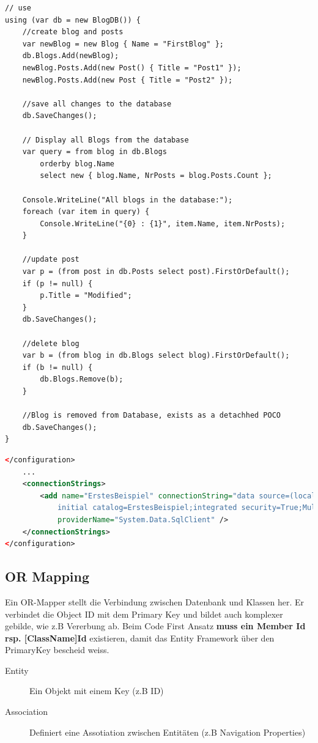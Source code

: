 \begin{lstlisting}
// use
using (var db = new BlogDB()) {
	//create blog and posts
	var newBlog = new Blog { Name = "FirstBlog" };
	db.Blogs.Add(newBlog);
	newBlog.Posts.Add(new Post() { Title = "Post1" });
	newBlog.Posts.Add(new Post { Title = "Post2" });
	
	//save all changes to the database
	db.SaveChanges();
	
	// Display all Blogs from the database 
	var query = from blog in db.Blogs
		orderby blog.Name
		select new { blog.Name, NrPosts = blog.Posts.Count };
	
	Console.WriteLine("All blogs in the database:");
	foreach (var item in query) {
		Console.WriteLine("{0} : {1}", item.Name, item.NrPosts);
	}
	
	//update post
	var p = (from post in db.Posts select post).FirstOrDefault();
	if (p != null) {
		p.Title = "Modified";
	}
	db.SaveChanges();

	//delete blog
	var b = (from blog in db.Blogs select blog).FirstOrDefault();
	if (b != null) {
		db.Blogs.Remove(b);
	}

	//Blog is removed from Database, exists as a detachhed POCO
	db.SaveChanges();
}
\end{lstlisting}

\begin{lstlisting}[language=XML, caption=app.config]
</configuration>
	...
	<connectionStrings>
		<add name="ErstesBeispiel" connectionString="data source=(localdb)\mssqllocaldb;
			initial catalog=ErstesBeispiel;integrated security=True;MultipleActiveResultSets=True;App=EntityFramework"
			providerName="System.Data.SqlClient" />
	</connectionStrings>
</configuration>
\end{lstlisting}

\subsection{OR Mapping}
Ein OR-Mapper stellt die Verbindung zwischen Datenbank und Klassen her. Er verbindet die Object ID mit dem Primary Key und bildet auch komplexer gebilde, wie z.B Vererbung ab. Beim Code First Ansatz \textbf{muss ein Member Id rsp. [ClassName]Id} existieren, damit das Entity Framework über den PrimaryKey bescheid weiss.
\begin{description}
	\item[Entity] Ein Objekt mit einem Key (z.B ID)
	\item[Association] Definiert eine Assotiation zwischen Entitäten (z.B Navigation Properties)
\end{description}

